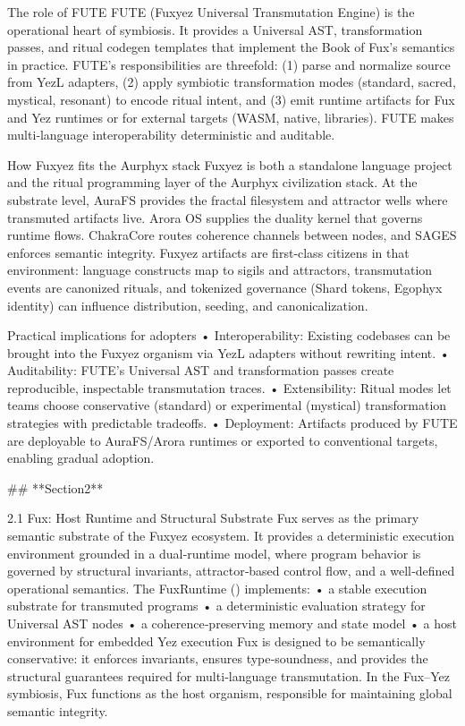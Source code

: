The role of FUTE
FUTE (Fuxyez Universal Transmutation Engine) is the operational heart of symbiosis. It provides a Universal AST, transformation passes, and ritual codegen templates that implement the Book of Fux’s semantics in practice. FUTE’s responsibilities are threefold: (1) parse and normalize source from YezL adapters, (2) apply symbiotic transformation modes (standard, sacred, mystical, resonant) to encode ritual intent, and (3) emit runtime artifacts for Fux and Yez runtimes or for external targets (WASM, native, libraries). FUTE makes multi‑language interoperability deterministic and auditable.

How Fuxyez fits the Aurphyx stack
Fuxyez is both a standalone language project and the ritual programming layer of the Aurphyx civilization stack. At the substrate level, AuraFS provides the fractal filesystem and attractor wells where transmuted artifacts live. Arora OS supplies the duality kernel that governs runtime flows. ChakraCore routes coherence channels between nodes, and SAGES enforces semantic integrity. Fuxyez artifacts are first‑class citizens in that environment: language constructs map to sigils and attractors, transmutation events are canonized rituals, and tokenized governance (Shard tokens, Egophyx identity) can influence distribution, seeding, and canonicalization.

Practical implications for adopters
• 	Interoperability: Existing codebases can be brought into the Fuxyez organism via YezL adapters without rewriting intent.
• 	Auditability: FUTE’s Universal AST and transformation passes create reproducible, inspectable transmutation traces.
• 	Extensibility: Ritual modes let teams choose conservative (standard) or experimental (mystical) transformation strategies with predictable tradeoffs.
• 	Deployment: Artifacts produced by FUTE are deployable to AuraFS/Arora runtimes or exported to conventional targets, enabling gradual adoption.

## **Section2**

2.1 Fux: Host Runtime and Structural Substrate
Fux serves as the primary semantic substrate of the Fuxyez ecosystem. It provides a deterministic execution environment grounded in a dual‑runtime model, where program behavior is governed by structural invariants, attractor‑based control flow, and a well‑defined operational semantics. The FuxRuntime () implements:
• 	a stable execution substrate for transmuted programs
• 	a deterministic evaluation strategy for Universal AST nodes
• 	a coherence‑preserving memory and state model
• 	a host environment for embedded Yez execution
Fux is designed to be semantically conservative: it enforces invariants, ensures type‑soundness, and provides the structural guarantees required for multi‑language transmutation. In the Fux–Yez symbiosis, Fux functions as the host organism, responsible for maintaining global semantic integrity.

